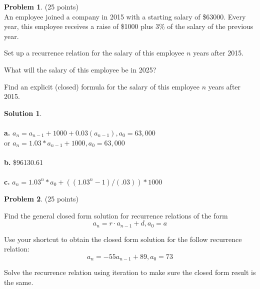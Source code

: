 \documentclass{article}
\theoremstyle{definition}
\newtheorem{problem}{Problem}
\newtheorem*{solution}{Solution}
\begin{document}
\newpage

\begin{problem} (25 points)\\
An employee joined a company in 2015 with a starting salary of \$63000.  Every year, this employee receives a raise of \$1000 plus 3\% of the salary of the previous year.
\begin{compactenum}
\renewcommand{\theenumi}{\alph{enumi}}
\item Set up a recurrence relation for the salary of this employee $n$ years after 2015.
\item What will the salary of this employee be in 2025?
\item Find an explicit (closed) formula for the salary of this employee $n$ years after 2015.
\end{compactenum}
\end{problem}

\begin{solution}\ \\
\ \\
\textbf{a.} $a_n = a_{n-1} + 1000 + 0.03(a_{n-1}) , a_0 = 63,000 $\ \\
or $a_n = 1.03*a_{n-1} + 1000 , a_0 = 63,000$\ \\
\ \\
\textbf{b.} \$96130.61\ \\
\ \\
\textbf{c.} $a_n = 1.03^n * a_0 + ((1.03^n - 1)/(.03))*1000 $
\ \\
\end{solution}

\newpage

\begin{problem} (25 points)
\begin{compactenum}
\item Find the general closed form solution for recurrence relations of the form
$$a_n = r\cdot a_{n-1}+d, a_0 = a$$

\item Use your shortcut to obtain the closed form solution for the follow recurrence relation:
$$a_n = -55a_{n-1} + 89, a_0 = 73$$

\item Solve the recurrence relation using iteration to make sure the closed form result is the same.
\end{compactenum}

\end{problem}
\end{document}
